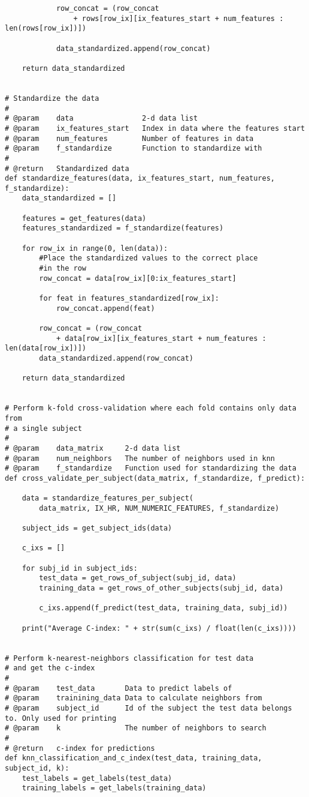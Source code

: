 \documentclass[a4paper]{article}
\begin{document}
\begin{lstlisting}
            row_concat = (row_concat 
                + rows[row_ix][ix_features_start + num_features : len(rows[row_ix])])

            data_standardized.append(row_concat)

    return data_standardized


# Standardize the data
#
# @param    data                2-d data list
# @param    ix_features_start   Index in data where the features start
# @param    num_features        Number of features in data
# @param    f_standardize       Function to standardize with
#
# @return   Standardized data
def standardize_features(data, ix_features_start, num_features, f_standardize):
    data_standardized = []

    features = get_features(data)
    features_standardized = f_standardize(features)

    for row_ix in range(0, len(data)):
        #Place the standardized values to the correct place 
        #in the row 
        row_concat = data[row_ix][0:ix_features_start]

        for feat in features_standardized[row_ix]:
            row_concat.append(feat)

        row_concat = (row_concat 
            + data[row_ix][ix_features_start + num_features : len(data[row_ix])])
        data_standardized.append(row_concat)

    return data_standardized


# Perform k-fold cross-validation where each fold contains only data from
# a single subject
#
# @param    data_matrix     2-d data list 
# @param    num_neighbors   The number of neighbors used in knn
# @param    f_standardize   Function used for standardizing the data
def cross_validate_per_subject(data_matrix, f_standardize, f_predict):

    data = standardize_features_per_subject(
        data_matrix, IX_HR, NUM_NUMERIC_FEATURES, f_standardize)

    subject_ids = get_subject_ids(data)

    c_ixs = []

    for subj_id in subject_ids:
        test_data = get_rows_of_subject(subj_id, data)
        training_data = get_rows_of_other_subjects(subj_id, data)

        c_ixs.append(f_predict(test_data, training_data, subj_id))

    print("Average C-index: " + str(sum(c_ixs) / float(len(c_ixs))))


# Perform k-nearest-neighbors classification for test data
# and get the c-index
#
# @param    test_data       Data to predict labels of
# @param    trainining_data Data to calculate neighbors from
# @param    subject_id      Id of the subject the test data belongs to. Only used for printing
# @param    k               The number of neighbors to search
#
# @return   c-index for predictions
def knn_classification_and_c_index(test_data, training_data, subject_id, k):
    test_labels = get_labels(test_data)
    training_labels = get_labels(training_data)


\end{lstlisting}
\end{document}
